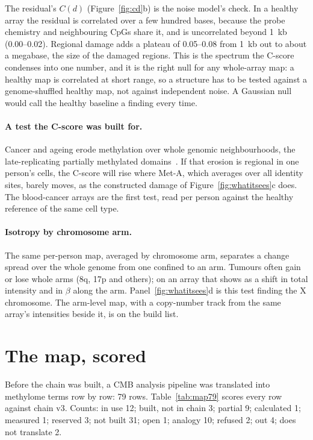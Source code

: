 The residual's $C(d)$ (Figure~\ref{fig:cd}b) is the noise model's check. In a healthy array the residual is correlated over a few hundred
bases, because the probe chemistry and neighbouring CpGs share it, and is uncorrelated beyond 1~kb (0.00--0.02). Regional damage adds a
plateau of 0.05--0.08 from 1~kb out to about a megabase, the size of the damaged regions. \measured{} This is the spectrum the C-score
condenses into one number, and it is the right null for any whole-array map: a healthy map is correlated at short range, so a structure has
to be tested against a genome-shuffled healthy map, not against independent noise.
A Gaussian null would call the healthy baseline a finding every time.

\paragraph{A test the C-score was built for.} Cancer and ageing erode methylation over whole genomic neighbourhoods, the late-replicating
partially methylated domains~\cite{Berman2012,Zhou2018PMD}. If that
erosion is regional in one person's cells, the C-score will rise where Met-A, which averages over all identity sites, barely moves, as the
constructed damage of Figure~\ref{fig:whatitsees}c does. \prediction{} The blood-cancer arrays are the first test, read per person against the
healthy reference of the same cell type.

\paragraph{Isotropy by chromosome arm.} The same per-person map, averaged by chromosome arm, separates a change spread over the whole genome
from one confined to an arm. Tumours often gain or lose whole arms (8q, 17p and others); on an array that shows as a shift in total intensity
and in $\beta$ along the arm. Panel~\ref{fig:whatitsees}d is this test finding the X chromosome. The arm-level map, with a copy-number track
from the same array's intensities beside it, is on the build list.

\section{The map, scored}

Before the chain was built, a CMB analysis pipeline was translated into methylome terms row by row: 79 rows. Table~\ref{tab:map79} scores every row against chain v3. Counts: in use 12; built, not in chain 3; partial 9; calculated 1; measured 1; reserved 3; not built 31; open 1; analogy 10; refused 2; out 4; does not translate 2. \observed

